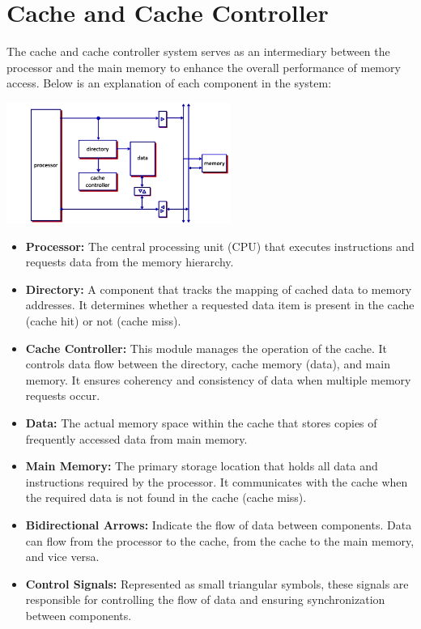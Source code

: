 \section{Cache and Cache Controller}
The cache and cache controller system serves as an intermediary between the processor and the main memory to enhance the overall performance of memory access. Below is an explanation of each component in the system:
\begin{center}
    \includegraphics[width=0.55\textwidth]{chapters/chapter3a/images/cache_rep.png}
\end{center}

\begin{itemize}
    \item \textbf{Processor:} The central processing unit (CPU) that executes instructions and requests data from the memory hierarchy.

    \item \textbf{Directory:} A component that tracks the mapping of cached data to memory addresses. It determines whether a requested data item is present in the cache (cache hit) or not (cache miss).

    \item \textbf{Cache Controller:} This module manages the operation of the cache. It controls data flow between the directory, cache memory (data), and main memory. It ensures coherency and consistency of data when multiple memory requests occur.

    \item \textbf{Data:} The actual memory space within the cache that stores copies of frequently accessed data from main memory.

    \item \textbf{Main Memory:} The primary storage location that holds all data and instructions required by the processor. It communicates with the cache when the required data is not found in the cache (cache miss).

    \item \textbf{Bidirectional Arrows:} Indicate the flow of data between components. Data can flow from the processor to the cache, from the cache to the main memory, and vice versa.

    \item \textbf{Control Signals:} Represented as small triangular symbols, these signals are responsible for controlling the flow of data and ensuring synchronization between components.
\end{itemize}

